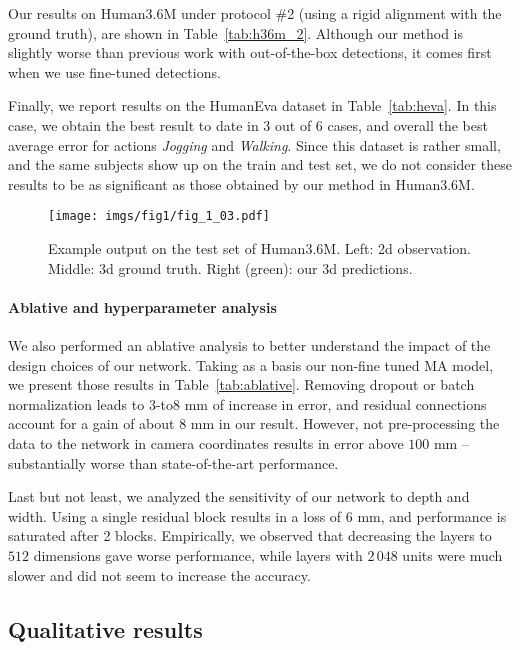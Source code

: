 \documentclass[10pt,twocolumn,letterpaper]{article}
\begin{document}
Our results on Human3.6M under protocol \#2 (using a rigid alignment with the ground truth), are shown in Table~\ref{tab:h36m_2}. 
Although our method is slightly worse than previous work with out-of-the-box detections, it comes first when we use fine-tuned detections.

Finally, we report results on the HumanEva dataset in Table~\ref{tab:heva}. In this case, we obtain the best result to date in 3 out of 6 cases, and overall the best average error for actions \textit{Jogging} and \textit{Walking}. Since this dataset is rather small, and the same subjects show up on the train and test set, we do not consider these results to be as significant as those obtained by our method in Human3.6M.

\begin{figure*}
  \texttt{[image: imgs/fig1/fig\_1\_03.pdf]}
  \vspace{-3mm}
  \caption{Example output on the test set of Human3.6M. Left: 2d observation. Middle: 3d ground truth. Right (green): our 3d predictions.
}
  \label{fig:qualitative}
\end{figure*}

\paragraph{Ablative and hyperparameter analysis}

We also performed an ablative analysis to better understand the impact of the design choices of our network. Taking as a basis our non-fine tuned MA model, we present those results in Table~\ref{tab:ablative}. Removing dropout or batch normalization leads to $3$-to$8$ mm of increase in error, and residual connections account for a gain of about $8$ mm in our result.
However, not pre-processing the data to the network in camera coordinates results in error above $100$ mm -- substantially worse than state-of-the-art performance.

Last but not least, we analyzed the sensitivity of our network to depth and width. Using a single residual block results in a loss of $6$ mm, and performance is saturated after 2 blocks. Empirically, we observed that decreasing the layers to $512$ dimensions gave worse performance, while layers with $2\,048$ units were much slower and did not seem to increase the accuracy.

\subsection{Qualitative results}
\end{document}
